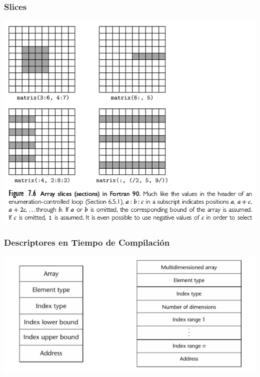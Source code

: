 \documentclass[11pt]{article}
\begin{document}
\subsubsection*{Slices}
\label{sec:orgheadline27}

\includegraphics[width=.9\linewidth]{slicesfort.png}

\subsubsection*{Descriptores en Tiempo de Compilación}
\label{sec:orgheadline28}

\includegraphics[width=.9\linewidth]{descriptoresarray.png}
\end{document}
